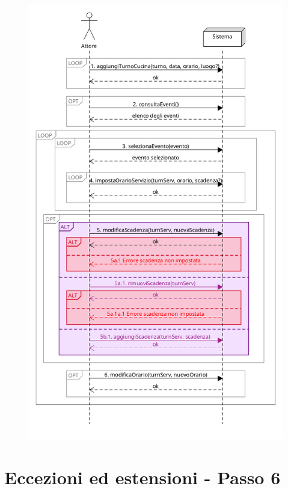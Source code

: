 \begin{figure}[h]
    \begin{center}
      \includegraphics[scale = 0.42]{images/SSD/SSD - Passo 5.png}
    \end{center}
  \end{figure}

\pagebreak
\section{Eccezioni ed estensioni - Passo 6}

